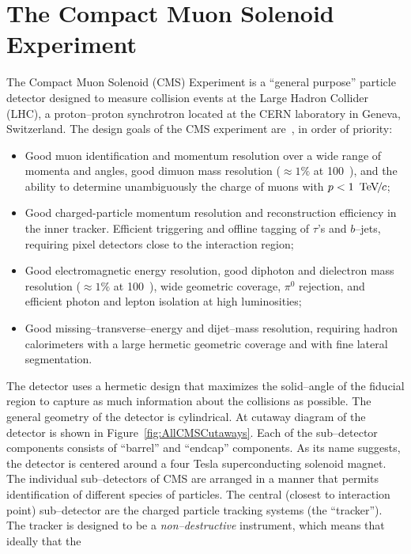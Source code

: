 \ifx\master\undefined\fi
\chapter{The Compact Muon Solenoid Experiment}
\label{ch:detector}
%

The Compact Muon Solenoid (CMS) Experiment is a ``general purpose'' particle
detector designed to measure collision events at the Large Hadron Collider
(LHC), a proton--proton synchrotron located at the CERN laboratory in Geneva,
Switzerland.  The design goals of the CMS experiment are~\cite{CMSExperiment},
in order of priority:
\begin{itemize}
  \item Good muon identification and momentum resolution over a wide range of
    momenta and angles, good dimuon mass resolution ($\approx 1\%$ at 100~\GeVcc),
    and the ability to determine unambiguously the charge of muons with $p <
    1~{\,\text{Te\hspace{-.08em}V\hspace{-0.16em}/\hspace{-0.08em}}c}$;
  \item Good charged-particle momentum resolution and reconstruction efficiency
    in the inner tracker. Efficient triggering and offline tagging of $\tau$'s and
    $b$--jets, requiring pixel detectors close to the interaction region;
  \item Good electromagnetic energy resolution, good diphoton and dielectron
    mass resolution ($\approx 1\%$ at 100~\GeVcc), wide geometric coverage,
    $\pi^0$ rejection, and efficient photon and lepton isolation at high
    luminosities;
  \item Good missing--transverse--energy and dijet--mass resolution, requiring
    hadron calorimeters with a large hermetic geometric coverage and with fine
    lateral segmentation.
\end{itemize}
The detector uses a hermetic design that maximizes the
solid--angle of the fiducial region to capture as much information about the
collisions as possible.  The general geometry of the detector is cylindrical.
At cutaway diagram of the detector is shown in Figure~\ref{fig:AllCMSCutaways}.
Each of the sub--detector components consists of ``barrel'' and ``endcap''
components.  As its name suggests, the detector is centered around a four Tesla
superconducting solenoid magnet.  The individual sub--detectors of CMS are
arranged in a manner that permits identification of different species of
particles.  The central (closest to interaction point) sub--detector are the
charged particle tracking systems (the ``tracker'').  The tracker is designed to
be a \emph{non--destructive} instrument, which means that ideally that the
